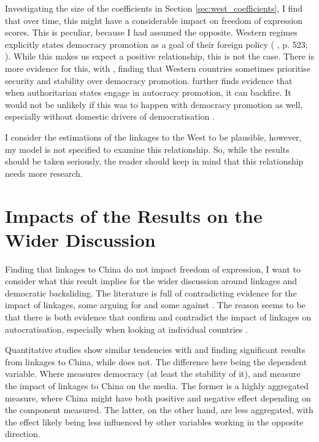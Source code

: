 Investigating the size of the coefficients in Section \ref{sec:west_coefficients}, I find that over time, this might have a considerable impact on freedom of expression scores. This is peculiar, because I had assumed the opposite. Western regimes explicitly states democracy promotion as a goal of their foreign policy (\citeauthor{borzel_noble_2015} \citeyear{borzel_noble_2015}, p. 523; \citeauthor{levitsky_linkage_2006} \citeyear{levitsky_linkage_2006}). While this makes us expect a positive relationship, this is not the case. There is more evidence for this, with \citet[pp. 523-524]{borzel_noble_2015}, \citet[pp. 464-466]{delcour_spoiler_2015} \citet{freyburg_local_2015} finding that Western countries sometimes prioritise security and stability over democracy promotion. \citep{delcour_spoiler_2015} further finds evidence that when authoritarian states engage in autocracy promotion, it can backfire. It would not be unlikely if this was to happen with democracy promotion as well, especially without domestic drivers of democratisation \citep{risse_democracy_2015}.

I consider the estimations of the linkages to the West to be plausible, however, my model is not specified to examine this relationship. So, while the results should be taken seriously, the reader should keep in mind that this relationship needs more research.

\section{Impacts of the Results on the Wider Discussion}
Finding that linkages to China do not impact freedom of expression, I want to consider what this result implies for the wider discussion around linkages and democratic backsliding. The literature is full of contradicting evidence for the impact of linkages, some arguing for \citep{gamso_is_2021, loughlin_chinese_2021, toettoe_foreign_2023, yilmaz_authoritarian_2020} and some against \citep{brownlee_limited_2017, wong_chinese_2019}. The reason seems to be that there is both evidence that confirm and contradict the impact of linkages on autocratisation, especially when looking at individual countries \citep{loughlin_chinese_2021, yilmaz_authoritarian_2020, wong_chinese_2019}. 

Quantitative studies show similar tendencies with \citet{gamso_is_2021} and \citet{toettoe_foreign_2023} finding significant results from linkages to China, while \citep{bader_china_2015} does not. The difference here being the dependent variable. Where \citet{bader_china_2015} measures democracy (at least the stability of it), \citet{gamso_is_2021} and \citet{toettoe_foreign_2023} measure the impact of linkages to China on the media. The former is a highly aggregated measure, where China might have both positive and negative effect depending on the component measured. The latter, on the other hand, are less aggregated, with the effect likely being less influenced by other variables working in the opposite direction.

